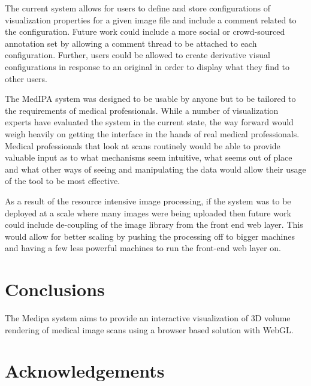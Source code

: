 \documentclass[annual]{acmsiggraph}
\begin{document}
The current system allows for users to define and store configurations of visualization properties for a given image file and include a comment related to the configuration.  Future work could include a more social or crowd-sourced annotation set by allowing a comment thread to be attached to each configuration.  Further, users could be allowed to create derivative visual configurations in response to an original in order to display what they find to other users.

The MedIPA system was designed to be usable by anyone but to be tailored to the requirements of medical professionals.  While a number of visualization experts have evaluated the system in the current state, the way forward would weigh heavily on getting the interface in the hands of real medical professionals.  Medical professionals that look at scans routinely would be able to provide valuable input as to what mechanisms seem intuitive, what seems out of place and what other ways of seeing and manipulating the data would allow their usage of the tool to be most effective.

As a result of the resource intensive image processing, if the system was to be deployed at a scale where many images were being uploaded then future work could include de-coupling of the image library from the front end web layer.  This would allow for better scaling by pushing the processing off to bigger machines and having a few less powerful machines to run the front-end web layer on.

\section{Conclusions}

The Medipa system aims to provide an interactive visualization of 3D volume rendering of medical image scans using a browser based solution with WebGL.


\section*{Acknowledgements}




\end{document}
